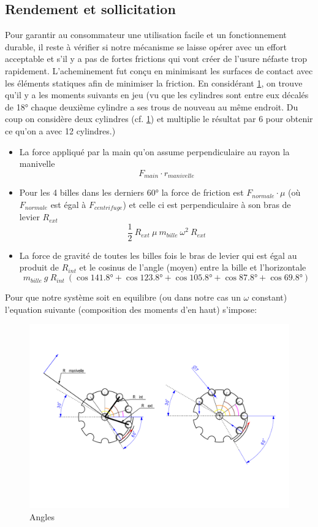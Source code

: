 \subsection{Rendement et sollicitation}
Pour garantir au consommateur une utilisation facile et un fonctionnement durable, il reste à vérifier si notre mécanisme se laisse opérer avec un effort acceptable et s'il y a pas de fortes frictions qui vont créer de l'usure néfaste trop rapidement. L'acheminement fut conçu en minimisant les surfaces de contact avec les éléments statiques afin de minimiser la friction. En considérant \ref{fig:4.3}, on trouve qu'il y a les moments suivants en jeu (vu que les cylindres sont entre eux décalés de \ang{18} chaque deuxième cylindre a ses trous de nouveau au même endroit. Du coup on considère deux cylindres (cf. \ref{fig:4.3}) et multiplie le résultat par 6 pour obtenir ce qu'on a avec \num{12} cylindres.) 
\begin{itemize}
    \item La force appliqué par la main qu'on assume perpendiculaire au rayon la manivelle
\[F_{main} \cdot r_{manivelle}\]
    \item Pour les \num{4} billes dans les derniers \ang{60} la force de friction est $F_{normale}\cdot \mu$ (où $F_{normale}$ est égal à $F_{centrifuge} $) et celle ci est perpendiculaire à son bras de levier $R_{ext}$
\[\frac{1}{2} \ R_{ext} \ \mu \ m_{bille} \ \omega^{2} \ R_{ext}\]   
    \item La force de gravité de toutes les billes fois le bras de levier qui est égal au produit de $R_{int}$ et le cosinus de l'angle (moyen) entre la bille et l'horizontale
\[m_{bille} \ g \ R_{int} \ (\cos{\ang{141.8}} + \cos{\ang{123.8}} + \cos{\ang{105.8}} + \cos{\ang{87.8}} + \cos{\ang{69.8}})\]
\end{itemize}
Pour que notre système soit en equilibre (ou dans notre cas un $\omega$ constant) l'equation suivante (composition des moments d'en haut) s'impose:

\begin{figure}
    \centering
    \includegraphics[width=\textwidth]{Graphics/Dessins_justification_Leon/DESSIN_EQUATION.pdf}
    \caption{Angles}
    \label{fig:4.3}
\end{figure}

